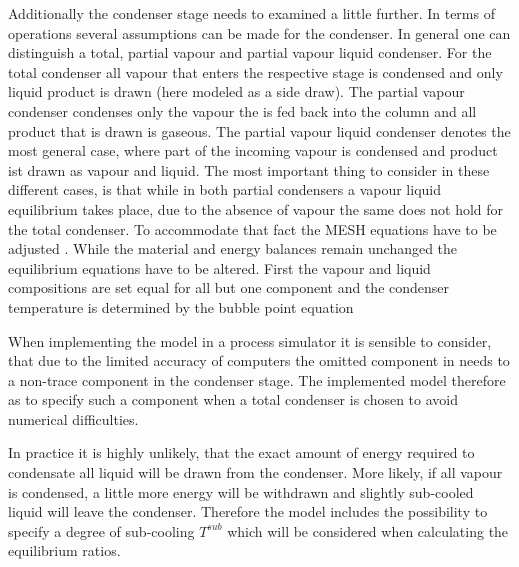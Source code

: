         Additionally the condenser stage needs to examined a little further. In terms of operations
        several assumptions can be made for the condenser. In general one can distinguish a total,
        partial vapour and partial vapour liquid condenser. For the total condenser all vapour that
        enters the respective stage is condensed and only liquid product is drawn (here modeled as
        a side draw). The partial vapour condenser condenses only the vapour the is fed back into
        the column and all product that is drawn is gaseous. The partial vapour liquid condenser
        denotes the most general case, where part of the incoming vapour is condensed and product
        ist drawn as vapour and liquid. The most important thing to consider in these different cases,
        is that while in both partial condensers a vapour liquid equilibrium takes place, due to the
        absence of vapour the same does not hold for the total condenser. To accommodate that fact
        the MESH equations have to be adjusted \cite{Naphtali.1971}. While the material and energy
        balances remain unchanged the equilibrium equations have to be altered. First the vapour and
        liquid compositions are set equal for all but one component
        and the condenser temperature is determined by the bubble point equation

        When implementing the model in a process simulator it is sensible to consider, that due to
        the limited accuracy of computers the omitted component in  needs to
        a non-trace component in the condenser stage. The implemented model therefore as to specify
        such a component when a total condenser is chosen to avoid numerical difficulties.

        In practice it is highly unlikely, that the exact amount of energy required to condensate all
        liquid will be drawn from the condenser. More likely, if all vapour is condensed, a little more
        energy will be withdrawn and slightly sub-cooled liquid will leave the condenser. Therefore
        the model includes the possibility to specify a degree of sub-cooling $T^{sub}$ which will be
        considered when calculating the equilibrium ratios.
        

